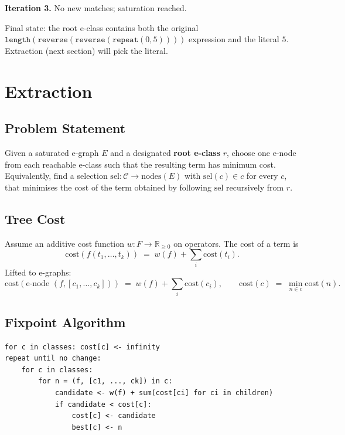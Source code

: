 \documentclass[11pt,a4paper]{article}
\begin{document}
\textbf{Iteration 3.} No new matches; saturation reached.

Final state: the root e-class contains both the original $\mathtt{length}(\mathtt{reverse}(\mathtt{reverse}(\mathtt{repeat}(0, 5))))$ expression and the literal $5$. Extraction (next section) will pick the literal.

\section{Extraction}\label{sec:extraction}

\subsection{Problem Statement}\label{sec:extr-problem}

Given a saturated e-graph $E$ and a designated \textbf{root e-class} $r$, choose one e-node from each reachable e-class such that the resulting term has minimum cost. Equivalently, find a selection $\mathrm{sel}: \mathcal{C} \to \mathrm{nodes}(E)$ with $\mathrm{sel}(c) \in c$ for every $c$, that minimises the cost of the term obtained by following $\mathrm{sel}$ recursively from $r$.

\subsection{Tree Cost}\label{sec:tree-cost}

Assume an additive cost function $w : F \to \mathbb{R}_{\ge 0}$ on operators. The cost of a term is
\[
  \mathrm{cost}(f(t_1, \ldots, t_k)) \;=\; w(f) + \sum_{i} \mathrm{cost}(t_i).
\]
Lifted to e-graphs:
\[
  \mathrm{cost}(\text{e-node } (f, [c_1, \ldots, c_k]))
    \;=\; w(f) + \sum_i \mathrm{cost}(c_i),
  \qquad
  \mathrm{cost}(c) \;=\; \min_{n \in c} \mathrm{cost}(n).
\]

\subsection{Fixpoint Algorithm}\label{sec:extr-fixpoint}

\begin{lstlisting}
for c in classes: cost[c] <- infinity
repeat until no change:
    for c in classes:
        for n = (f, [c1, ..., ck]) in c:
            candidate <- w(f) + sum(cost[ci] for ci in children)
            if candidate < cost[c]:
                cost[c] <- candidate
                best[c] <- n
\end{lstlisting}
\end{document}
